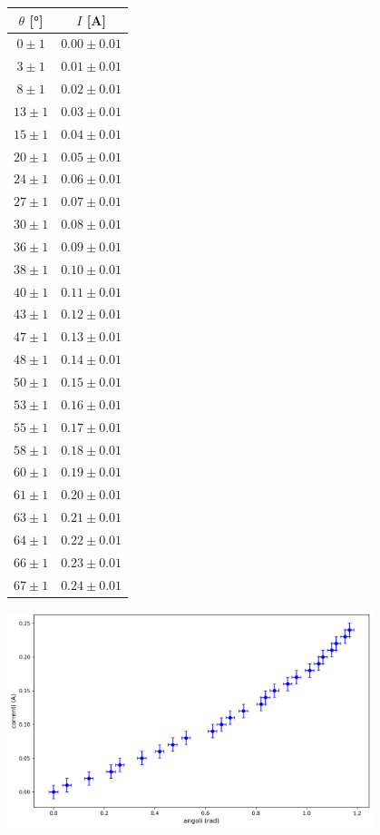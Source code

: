 \documentclass[a4paper]{article}
\begin{document}
\begin{center}
\begin{tabular}{|c|c|}
\hline
$\theta$ [°] & $I$ [A] \\
\hline
$0 \pm 1$ & $0.00 \pm 0.01$ \\
$3 \pm 1$ & $0.01 \pm 0.01$ \\
$8 \pm 1$ & $0.02 \pm 0.01$ \\
$13 \pm 1$ & $0.03 \pm 0.01$ \\
$15 \pm 1$ & $0.04 \pm 0.01$ \\
$20 \pm 1$ & $0.05 \pm 0.01$ \\
$24 \pm 1$ & $0.06 \pm 0.01$ \\
$27 \pm 1$ & $0.07 \pm 0.01$ \\
$30 \pm 1$ & $0.08 \pm 0.01$ \\
$36 \pm 1$ & $0.09 \pm 0.01$ \\
$38 \pm 1$ & $0.10 \pm 0.01$ \\
$40 \pm 1$ & $0.11 \pm 0.01$ \\
$43 \pm 1$ & $0.12 \pm 0.01$ \\
$47 \pm 1$ & $0.13 \pm 0.01$ \\
$48 \pm 1$ & $0.14 \pm 0.01$ \\
$50 \pm 1$ & $0.15 \pm 0.01$ \\
$53 \pm 1$ & $0.16 \pm 0.01$ \\
$55 \pm 1$ & $0.17 \pm 0.01$ \\
$58 \pm 1$ & $0.18 \pm 0.01$ \\
$60 \pm 1$ & $0.19 \pm 0.01$ \\
$61 \pm 1$ & $0.20 \pm 0.01$ \\
$63 \pm 1$ & $0.21 \pm 0.01$ \\
$64 \pm 1$ & $0.22 \pm 0.01$ \\
$66 \pm 1$ & $0.23 \pm 0.01$ \\
$67 \pm 1$ & $0.24 \pm 0.01$ \\
\hline
\end{tabular}
\end{center}

\begin{center}
    \includegraphics[width=0.8\textwidth]{grafici/bussola.png}
\end{center}
\end{document}
